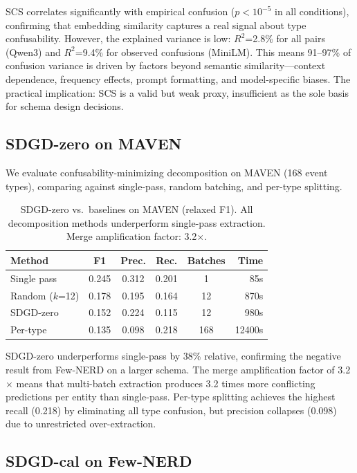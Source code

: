\documentclass[11pt,a4paper]{article}
\begin{document}
SCS correlates significantly with empirical confusion ($p<10^{-5}$ in all conditions), confirming that embedding similarity captures a real signal about type confusability. However, the explained variance is low: $R^2$=2.8\% for all pairs (Qwen3) and $R^2$=9.4\% for observed confusions (MiniLM). This means 91--97\% of confusion variance is driven by factors beyond semantic similarity---context dependence, frequency effects, prompt formatting, and model-specific biases. The practical implication: SCS is a valid but weak proxy, insufficient as the sole basis for schema design decisions.

\subsection{SDGD-zero on MAVEN}
\label{sec:sdgd}
\label{sec:sdgd_maven}

We evaluate confusability-minimizing decomposition on MAVEN (168 event types), comparing against single-pass, random batching, and per-type splitting.

\begin{table}[h]
\centering
\small
\begin{tabular}{@{}lccccr@{}}
\toprule
\textbf{Method} & \textbf{F1} & \textbf{Prec.} & \textbf{Rec.} & \textbf{Batches} & \textbf{Time} \\
\midrule
Single pass & 0.245 & 0.312 & 0.201 & 1 & 85s \\
Random ($k$=12) & 0.178 & 0.195 & 0.164 & 12 & 870s \\
SDGD-zero & 0.152 & 0.224 & 0.115 & 12 & 980s \\
Per-type & 0.135 & 0.098 & 0.218 & 168 & 12400s \\
\bottomrule
\end{tabular}
\caption{SDGD-zero vs.\ baselines on MAVEN (relaxed F1). All decomposition methods underperform single-pass extraction. Merge amplification factor: 3.2$\times$.}
\label{tab:sdgd_maven}
\end{table}

SDGD-zero underperforms single-pass by 38\% relative, confirming the negative result from Few-NERD on a larger schema. The merge amplification factor of 3.2$\times$ means that multi-batch extraction produces 3.2 times more conflicting predictions per entity than single-pass. Per-type splitting achieves the highest recall (0.218) by eliminating all type confusion, but precision collapses (0.098) due to unrestricted over-extraction.

\subsection{SDGD-cal on Few-NERD}
\label{sec:sdgd_cal_fewnerd}
\end{document}
